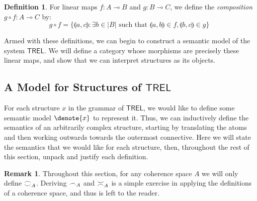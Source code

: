 \documentclass[11pt, oneside]{article}
\theoremstyle{plain}
\theoremstyle{definition}
\newtheorem{definition}[theorem]{Definition}
\newtheorem*{remark}{Remark}
\DeclarePairedDelimiter\denote\llbracket\rrbracket
\newcommand{\lp}{\llparenthesis}
\newcommand{\rp}{\rrparenthesis}
\newcommand{\sSys}{{\mathsf{TREL}}}%
\newcommand{\coh}[1][]{\mathrel{\vcenter{\offinterlineskip\hbox{$\frown$}\vskip0.2ex\hbox{$\smile$}}_{\ifx\\#1\\\else#1\fi}}}
\newcommand{\incoh}[1][]{\mathrel{\vcenter{\offinterlineskip\hbox{$\smile$}\vskip0.2ex\hbox{$\frown$}}_{\ifx\\#1\\\else#1\fi}}}
\newcommand{\scoh}[1][]{\mathrel{\frown}_{\ifx\\#1\\\else#1\fi}}
\newcommand{\comp}{\mathbin{\circ}}
\begin{document}
\begin{definition}
    For linear maps $f:A\multimap B$ and $g:B\multimap C$, we define the \textit{composition} $g\comp f:A\multimap C$ by:
    $$g\comp f = \{\lp a,c\rp:\exists b\in|B|\text{ such that }\lp a,b\rp\in f, \lp b,c\rp\in g\}$$
\end{definition}

Armed with these definitions, we can begin to construct a semantic model of the system $\sSys$.
We will define a category whose morphisms are precisely these linear maps, and show that we can interpret structures as its objects.

\subsection{A Model for Structures of $\sSys$}

For each structure $x$ in the grammar of $\sSys$, we would like to define some semantic model $\denote{x}$ to represent it.
Thus, we can inductively define the semantics of an arbitrarily complex structure, starting by translating the atoms and then working outwards towards the outermost connective.
Here we will state the semantics that we would like for each structure, then, throughout the rest of this section, unpack and justify each definition.

\begin{remark}
    Throughout this section, for any coherence space $A$ we will only define $\coh[A]$.
    Deriving $\scoh[A]$ and $\incoh[A]$ is a simple exercise in applying the definitions of a coherence space, and thus is left to the reader.
\end{remark}
\end{document}
